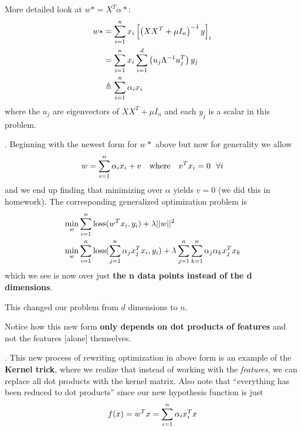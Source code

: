 \documentclass[12pt]{article}
\newcommand{\myspace}{\vspace{2\bigskipamount}}
\newcommand\p{\Needspace{10\baselineskip} \noindent}
\begin{document}
\p More detailed look at $w* = X^T\alpha*$:
	\begin{align}
	w* &= \sum_{i=1}^{n} x_i \left[\left(XX^T + \mu I_n\right)^{-1}y \right]_i \\
	&= \sum_{i=1}^{n} x_i \sum_{i=1}^{d} \left(u_j \Lambda^{-1} u_j^T \right) y_j \\
	&\triangleq \sum_{i=1}^{n} \alpha_i x_i 
	\end{align}
where the $u_j$ are eigenvectors of $XX^T + \mu I_n$ and each $y_j$ is a scalar in this problem.



\myspace 
\p {}. Beginning with the newest form for $w*$ above but now for generality we allow 
$$ w = \sum_{i=1}^{n} \alpha_i x_i + v \quad \text{where} \quad v^T x_i = 0 ~~ \forall i $$
and we end up finding that minimizing over $\alpha$ yields $v = 0$ (we did this in homework). The corresponding generalized optimization problem is
\begin{align}
&\min_{w} \sum_{i=1}^{n}  \text{loss}(w^Tx_i, y_i) + \lambda ||w||^2 \\
&\min_{w} \sum_{i=1}^{n}  \text{loss}(\sum_{j=1}^{n}\alpha_j x_j^T x_i, y_i) + \lambda \sum_{j=1}^{n}\sum_{k=1}^{n} \alpha_j \alpha_k x_j^T x_k
\end{align}
which we see is now over just \textbf{the n data points instead of the d dimensions}. 
\begin{compactitem}
	\item This changed our problem from $d$ dimensions to $n$. 
	\item Notice how this new form \textbf{only depends on dot products of features} and not the features [alone] themselves.
\end{compactitem}

\myspace

\myspace
\p {}. This new process of rewriting optimization in above form is an example of the \textbf{Kernel trick}, where we realize that instead of working with the \textit{features}, we can replace all dot products with the kernel matrix. Also note that ``everything has been reduced to dot products'' since our new hypothesis function is just 
\begin{align}
f(x) = w^T x = \sum_{i=1}^{n} \alpha_i x_i^T x
\end{align}
\end{document}
